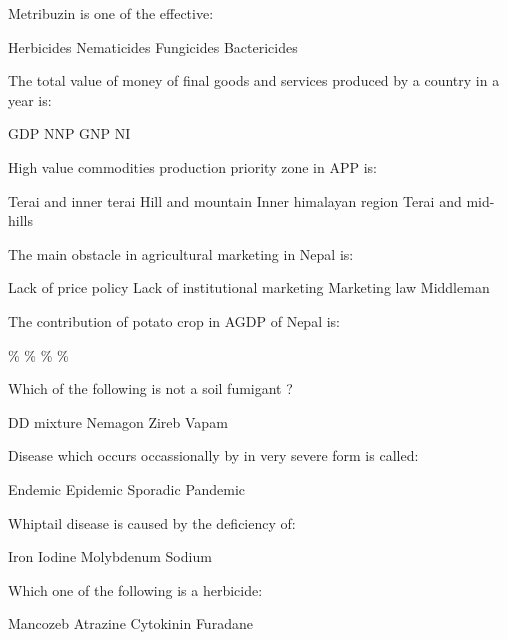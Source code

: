 \begin{questions}
\question Metribuzin is one of the effective:
  \begin{choices}
  \choice Herbicides
  \choice Nematicides
  \choice Fungicides
  \choice Bactericides
  \end{choices}

\question The total value of money of final goods and services produced by a country in a year is:
  \begin{choices}
  \choice GDP
  \choice NNP
  \choice GNP
  \choice NI
  \end{choices}

\question High value commodities production priority zone in APP is:
  \begin{choices}
  \choice Terai and inner terai
  \choice Hill and mountain
  \choice Inner himalayan region
  \choice Terai and mid-hills
  \end{choices}

\question The main obstacle in agricultural marketing in Nepal is:
  \begin{choices}
  \choice Lack of price policy
  \choice Lack of institutional marketing
  \choice Marketing law
  \choice Middleman
  \end{choices}

\question The contribution of potato crop in AGDP of Nepal is:
  \begin{choices}
  \%
  \%
  \%
  \%
  \end{choices}

\question Which of the following is not a soil fumigant ?
  \begin{choices}
  \choice DD mixture
  \choice Nemagon
  \choice Zireb
  \choice Vapam
  \end{choices}

\question Disease which occurs occassionally by in very severe form is called:
  \begin{choices}
  \choice Endemic
  \choice Epidemic
  \choice Sporadic
  \choice Pandemic
  \end{choices}

\question Whiptail disease is caused by the deficiency of:
  \begin{choices}
  \choice Iron
  \choice Iodine
  \choice Molybdenum
  \choice Sodium
  \end{choices}

\question Which one of the following is a herbicide:
  \begin{choices}
  \choice Mancozeb
  \choice Atrazine
  \choice Cytokinin
  \choice Furadane
  \end{choices}


\end{questions}
